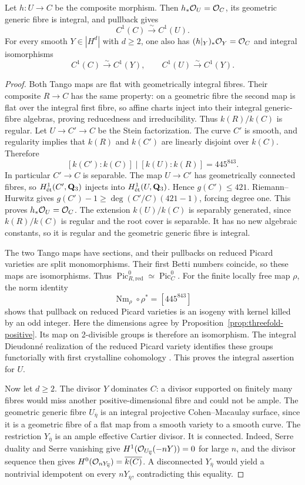 \begin{lemma}\label{lem:first-lattice}
Let $h:U\to C$ be the composite morphism. Then $h_*\mathcal O_U=\mathcal O_C$, its geometric generic fibre is integral, and pullback gives
\[
 C^1(C)\xrightarrow{\sim}C^1(U).
\]
For every smooth $Y\in|H^d|$ with $d\ge2$, one also has $(h|_Y)_*\mathcal O_Y=\mathcal O_C$ and integral isomorphisms
\[
 C^1(C)\xrightarrow{\sim}C^1(Y),\qquad C^1(U)\xrightarrow{\sim}C^1(Y).
\]
\end{lemma}
\begin{proof}
Both Tango maps are flat with geometrically integral fibres. Their composite $R\to C$ has the same property: on a geometric fibre the second map is flat over the integral first fibre, so affine charts inject into their integral generic-fibre algebras, proving reducedness and irreducibility. Thus $k(R)/k(C)$ is regular. Let $U\to C'\to C$ be the Stein factorization. The curve $C'$ is smooth, and regularity implies that $k(R)$ and $k(C')$ are linearly disjoint over $k(C)$. Therefore
\[
 [k(C'):k(C)]\mid[k(U):k(R)]=445^{843}.
\]
In particular $C'\to C$ is separable. The map $U\to C'$ has geometrically connected fibres, so $H^1_{\mathrm{\acute et}}(C',\mathbf Q_3)$ injects into $H^1_{\mathrm{\acute et}}(U,\mathbf Q_3)$. Hence $g(C')\le421$. Riemann--Hurwitz gives
$g(C')-1\ge\deg(C'/C)(421-1)$, forcing degree one. This proves $h_*\mathcal O_U=\mathcal O_C$. The extension $k(U)/k(C)$ is separably generated, since $k(R)/k(C)$ is regular and the root cover is separable. It has no new algebraic constants, so it is regular and the geometric generic fibre is integral.

The two Tango maps have sections, and their pullbacks on reduced Picard varieties are split monomorphisms. Their first Betti numbers coincide, so these maps are isomorphisms. Thus $\operatorname{Pic}^0_{R,\mathrm{red}}\simeq\operatorname{Pic}^0_C$. For the finite locally free map $\rho$, the norm identity
\[
 \operatorname{Nm}_\rho\circ\rho^*=[445^{843}]
\]
shows that pullback on reduced Picard varieties is an isogeny with kernel killed by an odd integer. Here the dimensions agree by Proposition~\ref{prop:threefold-positive}. Its map on 2-divisible groups is therefore an isomorphism. The integral Dieudonné realization of the reduced Picard variety identifies these groups functorially with first crystalline cohomology \citep[II, Proposition 3.11 and Remark 3.11.2, pp.~618--619]{Illusie}. This proves the integral assertion for $U$.

Now let $d\ge2$. The divisor $Y$ dominates $C$: a divisor supported on finitely many fibres would miss another positive-dimensional fibre and could not be ample. The geometric generic fibre $U_{\overline\eta}$ is an integral projective Cohen--Macaulay surface, since it is a geometric fibre of a flat map from a smooth variety to a smooth curve. The restriction $Y_{\overline\eta}$ is an ample effective Cartier divisor. It is connected. Indeed, Serre duality and Serre vanishing give $H^1(\mathcal O_{U_{\overline\eta}}(-nY))=0$ for large $n$, and the divisor sequence then gives $H^0(\mathcal O_{nY_{\overline\eta}})=\overline{k(C)}$. A disconnected $Y_{\overline\eta}$ would yield a nontrivial idempotent on every $nY_{\overline\eta}$, contradicting this equality.


\end{proof}
